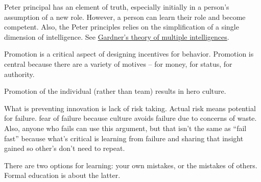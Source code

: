 Peter principal \cite{1970_Peter} has an element of truth, especially initially in a person's assumption of a new role. However, a person can learn their role and become competent. Also, the Peter principles relies on the simplification of a single dimension of intelligence. 
See \href{https://en.wikipedia.org/wiki/Theory_of_multiple_intelligences}{Gardner's theory of multiple intelligences}.


Promotion is a critical aspect of designing incentives for behavior. Promotion is central because there are a variety of motives -- for money, for status, for authority. 

Promotion of the individual (rather than team) results in hero culture.

What is preventing innovation is lack of risk taking. Actual risk means potential for failure. fear of failure because culture avoids failure due to concerns of waste. Also, anyone who fails can use this argument, but that isn't the same as ``fail fast'' because what's critical is learning from failure and sharing that insight gained so other's don't need to repeat. 

There are two options for learning: your own mistakes, or the mistakes of others. Formal education is about the latter.
